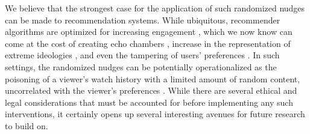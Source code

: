 \documentclass[%
 reprint,
superscriptaddress,
 amsmath,amssymb,
 aps,
 pre,
]{revtex4-1}
\begin{document}
We believe that the strongest case for the application of such randomized nudges can be made to recommendation systems. While ubiquitous, recommender algorithms are optimized for increasing engagement \cite{recommender-systems-and-their-ethical-challenges}, which we now know can come at the cost of creating echo chambers \cite{echo-chambers-in-collaborative-filtering-based-recommendation-systems}, increase in the representation of extreme ideologies \cite{recommender-systems-and-the-amplification-of-extremist-content}, and even the tampering of users' preferences \cite{user-tampering}. In such settings, the randomized nudges can be potentially operationalized as the poisoning of a viewer's watch history with a limited amount of random content, uncorrelated with the viewer's preferences \cite{youtube-audit}. While there are several ethical and legal considerations that must be accounted for before implementing any such interventions, it certainly opens up several interesting avenues for future research to build on. 



\end{document}
